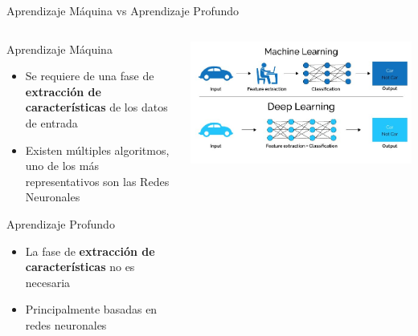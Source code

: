 \begin{frame}{Aprendizaje Máquina vs Aprendizaje Profundo}

		\begin{columns}
		\begin{column}{0.57\textwidth}
		\begin{block}{Aprendizaje Máquina} 
		\begin{itemize}
		\item Se requiere de una fase de \textbf{extracción de características} de los datos de entrada
		\item Existen múltiples algoritmos, uno de los más representativos son las Redes Neuronales
		\end{itemize}
		\end{block} 
        \begin{block}{Aprendizaje Profundo} 
		\begin{itemize}
		\item La fase de \textbf{extracción de características} no es necesaria
        \item Principalmente basadas en redes neuronales
		\end{itemize}
		\end{block} 

		\end{column}
		\begin{column}{0.37\textwidth}  
			\begin{center}
			 \includegraphics[width=\textwidth]{Figs/MachineLearningVsDeepLearning}
			 \end{center}
		\end{column}
	\end{columns}
\end{frame}

